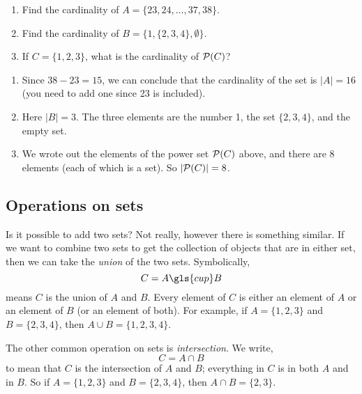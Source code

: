 \documentclass[12pt]{article}
\begin{document}
\begin{example}
\begin{enumerate}
\item Find the cardinality of $A = \{23, 24, \ldots, 37, 38\}$.
\item Find the cardinality of $B = \{1, \{2, 3, 4\}, \emptyset\}$.
\item If $C = \{1,2,3\}$, what is the cardinality of $\mathcal P(C)$?
\end{enumerate}
  
\begin{solution}
\begin{enumerate}
\item Since $38 - 23 = 15$, we can conclude that the cardinality of the set is $|A| = 16$ (you need to add one since 23 is included).
\item Here $|B| = 3$.  The three elements are the number 1, the set $\{2,3,4\}$, and the empty set.  
\item We wrote out the elements of the power set $\mathcal P(C)$ above, and there are 8 elements (each of which is a set).  So $|\mathcal P(C)| = 8$.\footnotemark
\end{enumerate}
 
\end{solution}
\end{example}

\subsection{Operations on sets}

Is it possible to add two sets?  Not really, however there is something similar.  If we want to combine two sets to get the collection of objects that are in either set, then we can take the \emph{union} of the two sets.  Symbolically,
\[ C = A \gls{cup} B\]
means $C$ is the union of $A$ and $B$.  Every element of $C$ is either an element of $A$ or an element of $B$ (or an element of both).  For example, if $A = \{1, 2, 3\}$ and $B = \{2, 3, 4\}$, then $A \cup B = \{1, 2, 3, 4\}$.

The other common operation on sets is \emph{intersection}.  We write,
\[ C = A \cap B\]
to mean that $C$ is the intersection of $A$ and $B$; everything in $C$ is in both $A$ and in $B$.  So if $A = \{1, 2, 3\}$ and $B = \{2, 3, 4\}$, then $A \cap B = \{2, 3\}$.  
\end{document}
